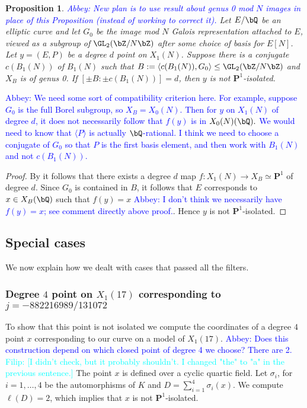 \documentclass[11pt,reqno]{amsart}
\theoremstyle{plain}
\newtheorem{proposition}[theorem]{Proposition}
\theoremstyle{definition}
\newcommand{\Q}{\bQ}
\newcommand{\Z}{\bZ}
\newcommand{\PP}{\mathbf P}
\newcommand{\filip}[1]{{\textcolor{cyan}{Filip: [#1]}}}
\newcommand{\abbey}[1]{\textcolor{blue}{Abbey: #1}}
\newcommand{\fedit}[1]{{\color{cyan} #1}}
\begin{document}
\begin{proposition} \abbey{New plan is to use result about genus 0 mod $N$ images in place of this Proposition (instead of working to correct it).}
    Let $E/\Q$ be an elliptic curve and let $G_0$ be the image mod $N$ Galois representation attached to $E$, viewed as a subgroup of $\GL_2(\Z/N\Z)$ after some choice of basis for $E[N]$. Let $y=(E,P)$ be a degree $d$ point on $X_1(N)$. Suppose there is a conjugate $c(B_1(N))$ of $B_1(N)$ such that $B:=\langle c(B_1(N)), G_0 \rangle \leq \GL_2(\Z/N\Z)$ and $X_B$ is of genus 0. If $[\pm B: \pm c(B_1(N))]=d$, then $y$ is not $\PP^1$-isolated.
\end{proposition}

\abbey{We need some sort of compatibility criterion here. For example, suppose $G_0$ is the full Borel subgroup, so $X_B=X_0(N)$. Then for $y$ on $X_1(N)$ of degree $d$, it does not necessarily follow that $f(y)$ is in $X_0(N)(\Q).$ We would need to know that $\langle P \rangle$ is actually $\Q$-rational. I think we need to choose a conjugate of $G_0$ so that $P$ is the first basis element, and then work with $B_1(N)$ and not $c(B_1(N))$.}

\begin{proof}
    By  it follows that there exists a degree $d$ map $f\colon X_1(N)\rightarrow X_B\simeq \PP^1$ of degree $d$. Since $G_0$ is contained in $B$, it follows that $E$ corresponds to  $x\in X_B(\Q)$ such that $f(y)=x$ \abbey{I don't think we necessarily have $f(y)=x$; see comment directly above proof.}. Hence $y$ is not $\PP^1$-isolated.
\end{proof}

\subsection{Special cases}
We now explain how we dealt with cases that passed all the filters. 

\subsubsection{Degree $4$ point on $X_1(17)$ corresponding to $j=-882216989/131072$}
To show that this point is not isolated we compute the coordinates of \fedit{a} degree $4$ point $x$ corresponding to our curve on a model of $X_1(17)$. \abbey{Does this construction depend on which closed point of degree 4 we choose? There are 2.} \filip{I didn't check, but it probably shouldn't. I changed "the" to "a" in the previous sentence.} The point $x$ is defined over a cyclic quartic field. Let $\sigma_i$, for $i=1,\ldots, 4$ be the automorphisms of $K$ and $D=\sum_{i=1}^4\sigma_i(x)$. We compute $\ell(D)=2$, which implies that $x$ is not $\PP^1$-isolated. 
\end{document}
